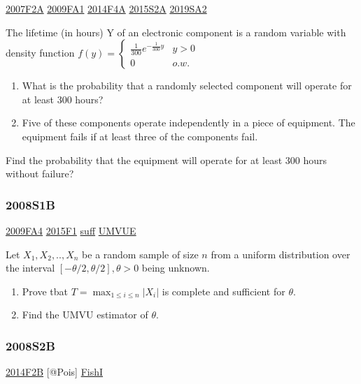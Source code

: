 \documentclass[10pt,twocolumn,portrait]{article}
\begin{document}
\protect\hyperlink{f2a}{2007F2A} \protect\hyperlink{fa1}{2009FA1}
\protect\hyperlink{f4a-1}{2014F4A} \protect\hyperlink{s2a-1}{2015S2A}
\protect\hyperlink{sa2-3}{2019SA2}

The lifetime (in hours) Y of an electronic component is a random
variable with density function
\(f(y)=\begin{cases}\frac1{300}e^{-\frac1{300}y}& y>0\\0& o.w.\end{cases}\)

\begin{enumerate}
\def\labelenumi{(\alph{enumi})}
\item
  What is the probability that a randomly selected component will
  operate for at least 300 hours?
\item
  Five of these components operate independently in a piece of
  equipment. The equipment fails if at least three of the components
  fail.
\end{enumerate}

Find the probability that the equipment will operate for at least 300
hours without failure?

\hypertarget{s1b}{%
\subsubsection{2008S1B}\label{s1b}}

\protect\hyperlink{fa4}{2009FA4} \protect\hyperlink{f1-5}{2015F1}
\protect\hyperlink{section-6}{suff} \protect\hyperlink{section-5}{UMVUE}

Let \(X_1,X_2,..,X_{n}\) be a random sample of size \(n\) from a uniform
distribution over the interval \([-\theta/2,\theta/2], \theta>0\) being
unknown.

\begin{enumerate}
\def\labelenumi{(\alph{enumi})}
\item
  Prove tbat \(T=\max_{1\le i\le n}|X_{i}|\) is complete and sufficient
  for \(\theta\).
\item
  Find the UMVU estimator of \(\theta\).
\end{enumerate}

\hypertarget{s2b}{%
\subsubsection{2008S2B}\label{s2b}}

\protect\hyperlink{f2b-1}{2014F2B} {[}@Pois{]}
\protect\hyperlink{section-5}{FishI}
\end{document}
